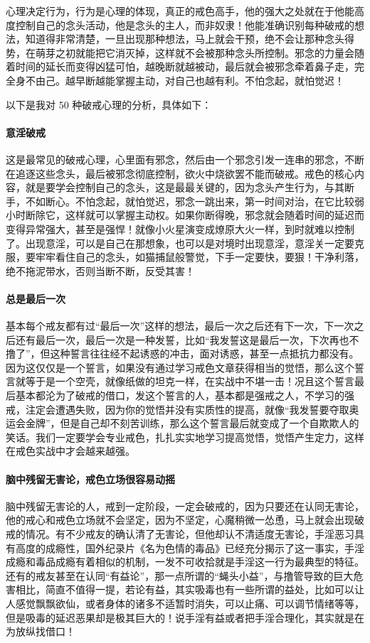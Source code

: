 心理决定行为，行为是心理的体现，真正的戒色高手，他的强大之处就在于他能高度控制自己的念头活动，他是念头的主人，而非奴隶！他能准确识别每种破戒的想法，知道得非常清楚，一旦出现那种想法，马上就会干预，绝不会让那种念头得势，在萌芽之初就能把它消灭掉，这样就不会被那种念头所控制。邪念的力量会随着时间的延长而变得凶猛可怕，越晚断就越被动，最后就会被邪念牵着鼻子走，完全身不由己。越早断越能掌握主动，对自己也越有利。不怕念起，就怕觉迟！

以下是我对 50 种破戒心理的分析，具体如下：

\paragraph{意淫破戒} 这是最常见的破戒心理，心里面有邪念，然后由一个邪念引发一连串的邪念，不断在追逐这些念头，最后被邪念彻底控制，欲火中烧欲罢不能而破戒。戒色的核心内容，就是要学会控制自己的念头，这是最最关键的，因为念头产生行为，与其断手，不如断心。不怕念起，就怕觉迟，邪念一跳出来，第一时间对治，在它比较弱小时断除它，这样就可以掌握主动权。如果你断得晚，邪念就会随着时间的延迟而变得异常强大，甚至是强悍！就像小火星演变成燎原大火一样，到时就难以控制了。出现意淫，可以是自己在那想象，也可以是对境时出现意淫，意淫关一定要克服，要牢牢看住自己的念头，如猫捕鼠般警觉，下手一定要快，要狠！干净利落，绝不拖泥带水，否则当断不断，反受其害！

\paragraph{总是最后一次} 基本每个戒友都有过“最后一次”这样的想法，最后一次之后还有下一次，下一次之后还有最后一次，最后一次是一种发誓，比如“我发誓这是最后一次，下次再也不撸了”，但这种誓言往往经不起诱惑的冲击，面对诱惑，甚至一点抵抗力都没有。因为这仅仅是一个誓言，如果没有通过学习戒色文章获得相当的觉悟，那么这个誓言就等于是一个空壳，就像纸做的坦克一样，在实战中不堪一击！况且这个誓言最后基本都沦为了破戒的借口，发这个誓言的人，基本都是强戒之人，不学习的强戒，注定会遭遇失败，因为你的觉悟并没有实质性的提高，就像“我发誓要夺取奥运会金牌”，但是自己却不刻苦训练，那么这个誓言最后就变成了一个自欺欺人的笑话。我们一定要学会专业戒色，扎扎实实地学习提高觉悟，觉悟产生定力，这样在戒色实战中才会越来越强。

\paragraph{脑中残留无害论，戒色立场很容易动摇} 脑中残留无害论的人，戒到一定阶段，一定会破戒的，因为只要还在认同无害论，他的戒心和戒色立场就不会坚定，因为不坚定，心魔稍微一怂恿，马上就会出现破戒的情况。有不少戒友的确认清了无害论，但他却认不清适度无害论，手淫恶习具有高度的成瘾性，国外纪录片《名为色情的毒品》已经充分揭示了这一事实，手淫成瘾和毒品成瘾有着相似的机制，一发不可收拾就是手淫这一行为最典型的特征。还有的戒友甚至在认同“有益论”，那一点所谓的“蝇头小益”，与撸管导致的巨大危害相比，简直不值得一提，若论有益，其实吸毒也有一些所谓的益处，比如可以让人感觉飘飘欲仙，或者身体的诸多不适暂时消失，可以止痛、可以调节情绪等等，但是吸毒的延迟恶果却是极其巨大的！说手淫有益或者把手淫合理化，其实就是在为放纵找借口！

